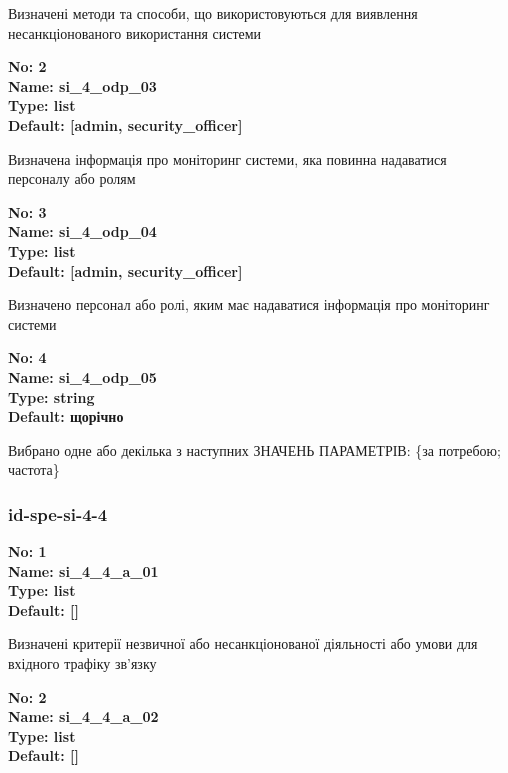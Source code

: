 \documentclass{article}
\begin{document}
{\footnotesize Визначені методи та способи, що використовуються для виявлення несанкціонованого використання системи}


{\footnotesize\bfseries
No: 2\\
Name: si\_\allowbreak{}4\_\allowbreak{}odp\_\allowbreak{}03\\
Type: list\\
Default: [\textquotedbl{}admin\textquotedbl{}, \textquotedbl{}security\_\allowbreak{}officer\textquotedbl{}]
}

{\footnotesize Визначена інформація про моніторинг системи, яка повинна надаватися персоналу або ролям}


{\footnotesize\bfseries
No: 3\\
Name: si\_\allowbreak{}4\_\allowbreak{}odp\_\allowbreak{}04\\
Type: list\\
Default: [\textquotedbl{}admin\textquotedbl{}, \textquotedbl{}security\_\allowbreak{}officer\textquotedbl{}]
}

{\footnotesize Визначено персонал або ролі, яким має надаватися інформація про моніторинг системи}


{\footnotesize\bfseries
No: 4\\
Name: si\_\allowbreak{}4\_\allowbreak{}odp\_\allowbreak{}05\\
Type: string\\
Default: \textquotedbl{}щорічно\textquotedbl{}
}

{\footnotesize Вибрано одне або декілька з наступних ЗНАЧЕНЬ ПАРАМЕТРІВ: \{за потребою; частота\}}




\subsubsection{id-spe-si-4-4}


\vspace{10pt}
{\footnotesize\bfseries
No: 1\\
Name: si\_\allowbreak{}4\_\allowbreak{}4\_\allowbreak{}a\_\allowbreak{}01\\
Type: list\\
Default: []
}

{\footnotesize Визначені критерії незвичної або несанкціонованої діяльності або умови для вхідного трафіку зв'язку}


{\footnotesize\bfseries
No: 2\\
Name: si\_\allowbreak{}4\_\allowbreak{}4\_\allowbreak{}a\_\allowbreak{}02\\
Type: list\\
Default: []
}
\end{document}
